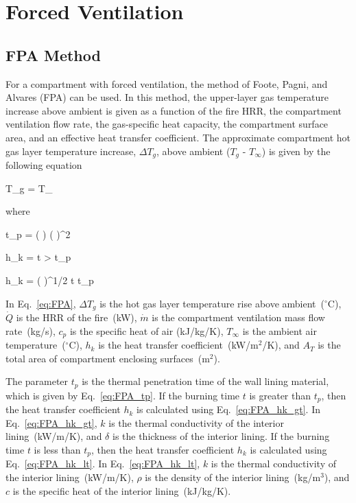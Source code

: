 %
%
%
%


\clearpage


\section{Forced Ventilation}

\subsection{FPA Method}

For a compartment with forced ventilation, the method of Foote, Pagni, and Alvares (FPA) can be used. In this method, the upper-layer gas temperature increase above ambient is given as a function of the fire HRR, the compartment ventilation flow rate, the gas-specific heat capacity, the compartment surface area, and an effective heat transfer coefficient. The approximate compartment hot gas layer temperature increase, $\Delta T_g$, above ambient ($T_g$ - $T_\infty$) is given by the following equation

\be
\Delta T_g =  T_\infty
\label{eq:FPA}
\ee

\noindent where

\be
t_p = \left(  \right) \left(  \right)^2
\label{eq:FPA_tp}
\ee

\be
h_k =   t > t_p
\label{eq:FPA_hk_gt}
\ee

\be
h_k = \left(  \right)^{1/2}  t \le t_p
\label{eq:FPA_hk_lt}
\ee

In Eq.~\ref{eq:FPA}, $\Delta T_g$ is the hot gas layer temperature rise above ambient~($^\circ$C), $\dot Q$ is the HRR of the fire~(kW), $\dot m$ is the compartment ventilation mass flow rate~(kg/s), $c_p$ is the specific heat of air (kJ/kg/K), $T_\infty$ is the ambient air temperature~($^\circ$C), $h_k$ is the heat transfer coefficient~(kW/m$^2$/K), and $A_T$ is the total area of compartment enclosing surfaces~(m$^2$).

The parameter $t_p$ is the thermal penetration time of the wall lining material, which is given by Eq.~\ref{eq:FPA_tp}. If the burning time $t$ is greater than $t_p$, then the heat transfer coefficient $h_k$ is calculated using Eq.~\ref{eq:FPA_hk_gt}. In Eq.~\ref{eq:FPA_hk_gt}, $k$ is the thermal conductivity of the interior lining~(kW/m/K), and $\delta$ is the thickness of the interior lining. If the burning time $t$ is less than $t_p$, then the heat transfer coefficient $h_k$ is calculated using Eq.~\ref{eq:FPA_hk_lt}. In Eq.~\ref{eq:FPA_hk_lt}, $k$ is the thermal conductivity of the interior lining~(kW/m/K), $\rho$ is the density of the interior lining~(kg/m$^3$), and $c$ is the specific heat of the interior lining~(kJ/kg/K).


